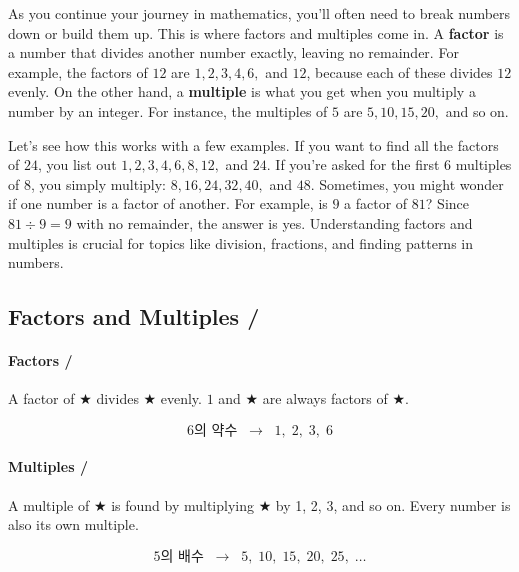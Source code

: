 As you continue your journey in mathematics, you'll often need to break numbers
down or build them up. This is where factors and multiples come in. A
\textbf{factor} is a number that divides another number exactly, leaving no
remainder. For example, the factors of \(12\) are \(1, 2, 3, 4, 6,\) and \(12\),
because each of these divides \(12\) evenly. On the other hand, a
\textbf{multiple} is what you get when you multiply a number by an integer. For
instance, the multiples of \(5\) are \(5, 10, 15, 20,\) and so on.

Let's see how this works with a few examples. If you want to find all the
factors of \(24\), you list out \(1, 2, 3, 4, 6, 8, 12,\) and \(24\). If you're
asked for the first \(6\) multiples of \(8\), you simply multiply: \(8, 16, 24,
32, 40,\) and \(48\). Sometimes, you might wonder if one number is a factor of
another. For example, is \(9\) a factor of \(81\)? Since \(81 \div 9 = 9\) with
no remainder, the answer is yes. Understanding factors and multiples is crucial
for topics like division, fractions, and finding patterns in numbers.


\subsection*{Factors and Multiples / }

\paragraph{Factors / }

A factor of ★ divides ★ evenly. $1$ and ★ are always factors of ★.

\[
6 \text{의 약수} \;\; \rightarrow \;\; 1, \; 2, \; 3, \; 6
\]


\paragraph{Multiples / }

A multiple of ★ is found by multiplying ★ by 1, 2, 3, and so on.
Every number is also its own multiple.


\[
5 \text{의 배수} \;\; \rightarrow \;\; 5, \; 10, \; 15, \; 20, \; 25, \; \ldots
\]



